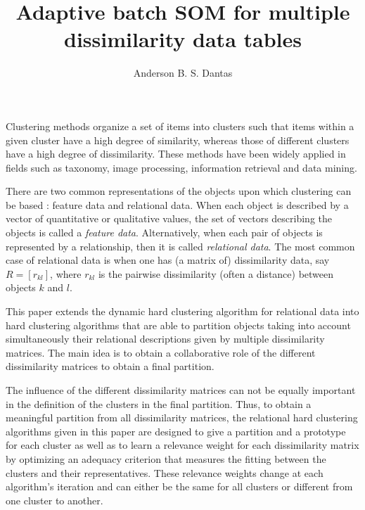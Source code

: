 \documentclass[12pt]{article}
\title{Adaptive batch SOM for multiple dissimilarity data tables}
\author{Anderson B. S. Dantas}
\begin{document}
 

\maketitle


Clustering methods organize a set of items into clusters such that items within a given cluster have a high degree of similarity, whereas those of different clusters have a high degree of dissimilarity. These methods have been widely applied in fields such as taxonomy, image processing, information retrieval and data mining.

There are two common representations of the objects upon which clustering can be based
: feature data and relational data.
When each object is described by a vector of quantitative or qualitative
values, the set of vectors describing the objects is called a \textit{feature data}. 
Alternatively, when each pair of objects is represented by a
relationship, then it is called \textit{relational data}. The most common case of
relational data is when one has (a matrix of) dissimilarity data, say
$R = [r_{kl}]$, where $r_{kl}$ is the pairwise dissimilarity (often a distance)
between objects $k$ and $l$.

This paper extends the dynamic hard clustering algorithm for relational data into hard clustering algorithms that are able to partition objects taking into account simultaneously their relational descriptions given by multiple dissimilarity matrices. 
The main idea is to obtain a collaborative role of the different dissimilarity matrices to obtain a final partition.

The influence of the different dissimilarity matrices can not be equally important in the definition of the clusters in the final partition. Thus, to obtain a meaningful partition from all dissimilarity matrices, the relational hard clustering algorithms given in this paper are designed to give a partition and a prototype for each cluster as well as to learn a relevance weight for each dissimilarity matrix by optimizing an adequacy criterion 
that measures the fitting between the clusters and their representatives. 
These relevance weights change at each algorithm's iteration and can either be the same for all clusters or different from one cluster to another. 
\end{document}
